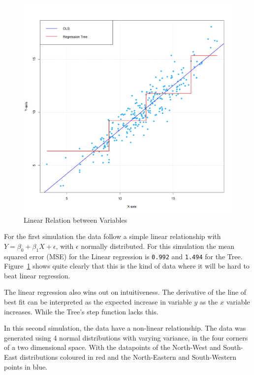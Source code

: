 \documentclass[12pt]{article}
\begin{document}
\begin{figure}
    \centering
    \includegraphics[scale=0.25]{OLS vs Tree.png}
    \caption{Linear Relation between Variables}
    \label{OLS_VS_TREE}
\end{figure}

For the first simulation the data follow a simple linear relationship with $Y = \beta_0 + \beta_1X + \epsilon$, with $\epsilon$ normally distributed. For this simulation the mean squared error (MSE) for the Linear regression is \texttt{0.992} and \texttt{1.494} for the Tree. Figure~\ref{OLS_VS_TREE} shows quite clearly that this is the kind of data where it will be hard to beat linear regression.

The linear regression also wins out on intuitiveness. The derivative of the line of best fit can be interpreted as the expected increase in variable $y$ as the $x$ variable increases. While the Tree's step function lacks this.

In this second simulation, the data have a non-linear relationship. The data was generated using 4 normal distributions with varying variance, in the four corners of a two dimensional space. With the datapoints of the North-West and South-East distributions coloured in red and the North-Eastern and South-Western points in blue.
\end{document}
